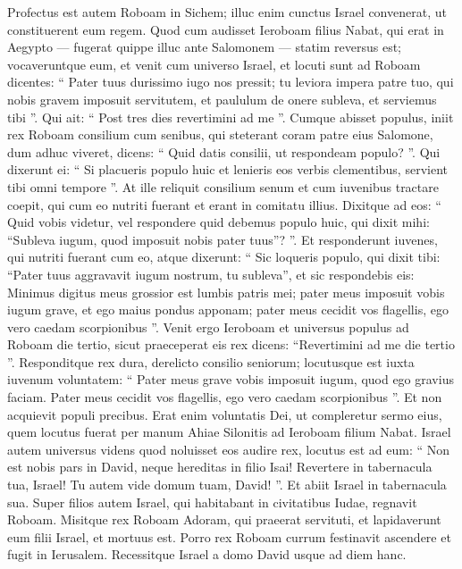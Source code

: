 \begin{biblechapter}
\begin{biblechapter}
\begin{biblechapter}
\begin{biblechapter}
\begin{biblechapter}
\begin{biblechapter}
\begin{biblechapter}
\begin{biblechapter}
\begin{biblechapter}
\begin{biblechapter}
\verse Profectus est autem Roboam in Sichem; illuc enim cunctus Israel convenerat, ut constituerent eum regem. 
\verse Quod cum audisset Ieroboam filius Nabat, qui erat in Aegypto — fugerat quippe illuc ante Salomonem — statim reversus est; 
\verse vocaveruntque eum, et venit cum universo Israel, et locuti sunt ad Roboam dicentes: 
\verse “ Pater tuus durissimo iugo nos pressit; tu leviora impera patre tuo, qui nobis gravem imposuit servitutem, et paululum de onere subleva, et serviemus tibi ”. 
\verse Qui ait: “ Post tres dies revertimini ad me ”.
 Cumque abisset populus, 
\verse iniit rex Roboam consilium cum senibus, qui steterant coram patre eius Salomone, dum adhuc viveret, dicens: “ Quid datis consilii, ut respondeam populo? ”. 
\verse Qui dixerunt ei: “ Si placueris populo huic et lenieris eos verbis clementibus, servient tibi omni tempore ”. 
\verse At ille reliquit consilium senum et cum iuvenibus tractare coepit, qui cum eo nutriti fuerant et erant in comitatu illius. 
\verse Dixitque ad eos: “ Quid vobis videtur, vel respondere quid debemus populo huic, qui dixit mihi: “Subleva iugum, quod imposuit nobis pater tuus”? ”. 
\verse Et responderunt iuvenes, qui nutriti fuerant cum eo, atque dixerunt: “ Sic loqueris populo, qui dixit tibi: “Pater tuus aggravavit iugum nostrum, tu subleva”, et sic respondebis eis: Minimus digitus meus grossior est lumbis patris mei; 
\verse pater meus imposuit vobis iugum grave, et ego maius pondus apponam; pater meus cecidit vos flagellis, ego vero caedam scorpionibus ”.
 \verse Venit ergo Ieroboam et universus populus ad Roboam die tertio, sicut praeceperat eis rex dicens: “Revertimini ad me die tertio ”. 
\verse Responditque rex dura, derelicto consilio seniorum; 
\verse locutusque est iuxta iuvenum voluntatem:
 “ Pater meus grave vobis imposuit iugum,
 quod ego gravius faciam.
 Pater meus cecidit vos flagellis,
 ego vero caedam scorpionibus ”.
 \verse Et non acquievit populi precibus. Erat enim voluntatis Dei, ut compleretur sermo eius, quem locutus fuerat per manum Ahiae Silonitis ad Ieroboam filium Nabat.
 \verse Israel autem universus videns quod noluisset eos audire rex, locutus est ad eum:
 “ Non est nobis pars in David,
 neque hereditas in filio Isai!
 Revertere in tabernacula tua, Israel!
 Tu autem vide domum tuam, David! ”.
 Et abiit Israel in tabernacula sua. 
\verse Super filios autem Israel, qui habitabant in civitatibus Iudae, regnavit Roboam. 
\verse Misitque rex Roboam Adoram, qui praeerat servituti, et lapidaverunt eum filii Israel, et mortuus est. Porro rex Roboam currum festinavit ascendere et fugit in Ierusalem. 
\verse Recessitque Israel a domo David usque ad diem hanc.
 

\end{biblechapter}
\end{biblechapter}
\end{biblechapter}
\end{biblechapter}
\end{biblechapter}
\end{biblechapter}
\end{biblechapter}
\end{biblechapter}
\end{biblechapter}
\end{biblechapter}
